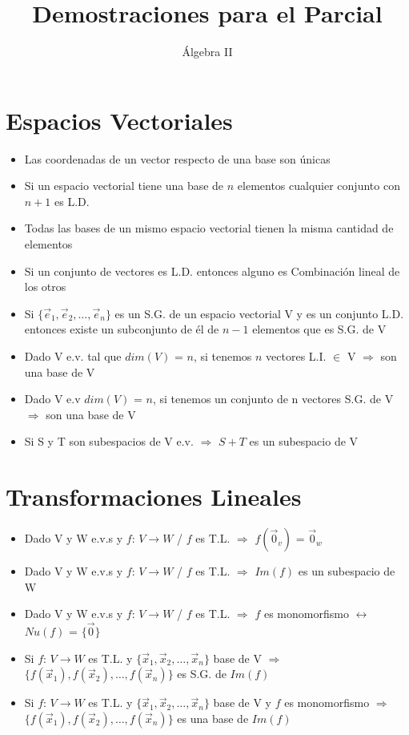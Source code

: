\documentclass[11pt]{article}
\title{Demostraciones para el Parcial}
\author{Álgebra II}
\date{\vspace{-5ex}}
\begin{document}
\maketitle{}
\section{Espacios Vectoriales}

\begin{itemize}
\item Las coordenadas de un vector respecto de una base son únicas 
\item Si un espacio vectorial tiene una base de $n$ elementos cualquier conjunto con $n+1$ es L.D.
\item Todas las bases de un mismo espacio vectorial tienen la misma cantidad de elementos
\item  Si un conjunto de vectores es L.D. entonces alguno es Combinación lineal de los otros 
\item  Si $\{ \vec{e}_1,\vec{e}_2,\hdots, \vec{e}_n\}$ es un S.G. de un espacio vectorial V y es un conjunto L.D. entonces existe un
subconjunto de él de $n-1$ elementos que es S.G. de V
\item  Dado V e.v. tal que $dim(V)$ = $n$, si tenemos $n$ vectores L.I. $\in$ V $\Rightarrow$ son una base de V 
\item  Dado V e.v $dim(V)$ = $n$, si tenemos un conjunto de n vectores S.G. de V $\Rightarrow$ son una base de V 
\item  Si S y T son subespacios de V e.v. $\Rightarrow$ $S+T$ es un subespacio de V 
\end{itemize}

\section{Transformaciones Lineales}
\begin{itemize}
\item Dado V y W e.v.s y $f$: $V \rightarrow W$ / $f$ es T.L. $\Rightarrow$  $f(\vec{0}_v)$ = $\vec{0}_w$ 
\item Dado V y W e.v.s y $f$: $V \rightarrow W$ / $f$ es T.L. $\Rightarrow$  $Im(f)$ es un subespacio de W
\item Dado V y W e.v.s y $f$: $V \rightarrow W$ / $f$ es T.L. $\Rightarrow$ $f$ es monomorfismo $\leftrightarrow$ $Nu(f)$ = $\{\vec{0}\}$
\item Si $f$: $V \rightarrow W$ es T.L. y $\{ \vec{x}_1,\vec{x}_2,\hdots, \vec{x}_n\}$ base de V $\Rightarrow$  $\{ f(\vec{x}_1),f(\vec{x}_2),\hdots, f(\vec{x}_n)\}$ es S.G. de $Im(f)$
\item Si $f$: $V \rightarrow W$ es T.L. y $\{ \vec{x}_1,\vec{x}_2,\hdots, \vec{x}_n\}$ base de V y $f$ es monomorfismo $\Rightarrow$  $\{ f(\vec{x}_1),f(\vec{x}_2),\hdots, f(\vec{x}_n)\}$ es una base de $Im(f)$
\end{itemize}
\end{document}
